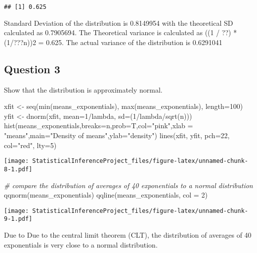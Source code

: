 \documentclass[
]{article}
\newenvironment{Shaded}{\begin{snugshade}}{\end{snugshade}}
\newcommand{\AttributeTok}[1]{\textcolor[rgb]{0.77,0.63,0.00}{#1}}
\newcommand{\CommentTok}[1]{\textcolor[rgb]{0.56,0.35,0.01}{\textit{#1}}}
\newcommand{\DecValTok}[1]{\textcolor[rgb]{0.00,0.00,0.81}{#1}}
\newcommand{\FunctionTok}[1]{\textcolor[rgb]{0.00,0.00,0.00}{#1}}
\newcommand{\NormalTok}[1]{#1}
\newcommand{\OtherTok}[1]{\textcolor[rgb]{0.56,0.35,0.01}{#1}}
\newcommand{\SpecialCharTok}[1]{\textcolor[rgb]{0.00,0.00,0.00}{#1}}
\newcommand{\StringTok}[1]{\textcolor[rgb]{0.31,0.60,0.02}{#1}}
\begin{document}
\begin{verbatim}
## [1] 0.625
\end{verbatim}

Standard Deviation of the distribution is 0.8149954 with the theoretical
SD calculated as 0.7905694. The Theoretical variance is calculated as
((1 / ??) * (1/???n))2 = 0.625. The actual variance of the distribution
is 0.6291041

\hypertarget{question-3}{%
\subsection{Question 3}\label{question-3}}

Show that the distribution is approximately normal.

\begin{Shaded}
\begin{Highlighting}[]
\NormalTok{xfit }\OtherTok{\textless{}{-}} \FunctionTok{seq}\NormalTok{(}\FunctionTok{min}\NormalTok{(means\_exponentials), }\FunctionTok{max}\NormalTok{(means\_exponentials), }\AttributeTok{length=}\DecValTok{100}\NormalTok{)}
\NormalTok{yfit }\OtherTok{\textless{}{-}} \FunctionTok{dnorm}\NormalTok{(xfit, }\AttributeTok{mean=}\DecValTok{1}\SpecialCharTok{/}\NormalTok{lambda, }\AttributeTok{sd=}\NormalTok{(}\DecValTok{1}\SpecialCharTok{/}\NormalTok{lambda}\SpecialCharTok{/}\FunctionTok{sqrt}\NormalTok{(n)))}
\FunctionTok{hist}\NormalTok{(means\_exponentials,}\AttributeTok{breaks=}\NormalTok{n,}\AttributeTok{prob=}\NormalTok{T,}\AttributeTok{col=}\StringTok{"pink"}\NormalTok{,}\AttributeTok{xlab =} \StringTok{"means"}\NormalTok{,}\AttributeTok{main=}\StringTok{"Density of means"}\NormalTok{,}\AttributeTok{ylab=}\StringTok{"density"}\NormalTok{) }
\FunctionTok{lines}\NormalTok{(xfit, yfit, }\AttributeTok{pch=}\DecValTok{22}\NormalTok{, }\AttributeTok{col=}\StringTok{"red"}\NormalTok{, }\AttributeTok{lty=}\DecValTok{5}\NormalTok{)}
\end{Highlighting}
\end{Shaded}

\texttt{[image: StatisticalInferenceProject\_files/figure-latex/unnamed-chunk-8-1.pdf]}

\begin{Shaded}
\begin{Highlighting}[]
\CommentTok{\# compare the distribution of averages of 40 exponentials to a normal distribution}
\FunctionTok{qqnorm}\NormalTok{(means\_exponentials)}
\FunctionTok{qqline}\NormalTok{(means\_exponentials, }\AttributeTok{col =} \DecValTok{2}\NormalTok{)}
\end{Highlighting}
\end{Shaded}

\texttt{[image: StatisticalInferenceProject\_files/figure-latex/unnamed-chunk-9-1.pdf]}

Due to Due to the central limit theorem (CLT), the distribution of
averages of 40 exponentials is very close to a normal distribution.
\end{document}
